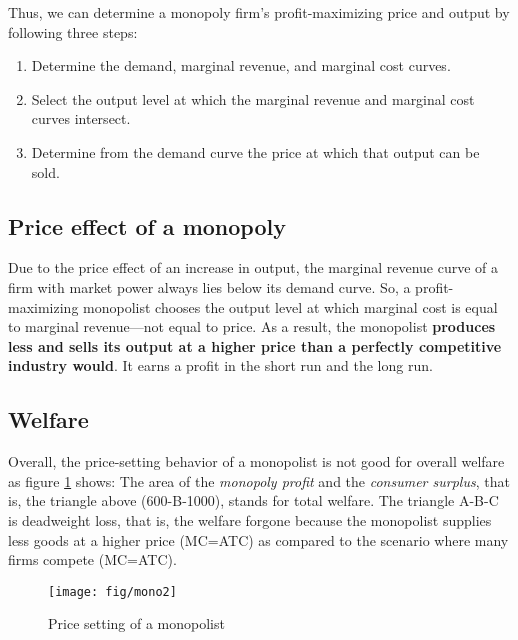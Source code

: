 Thus, we can determine a monopoly firm's profit-maximizing price and output by following three steps:

\begin{enumerate}
	\item
	Determine the demand, marginal revenue, and marginal cost curves.
	\item
	Select the output level at which the marginal revenue and marginal cost curves intersect.
	\item
	Determine from the demand curve the price at which that output can be sold.
\end{enumerate}

\subsection{Price effect of a monopoly}\label{price-effect-of-a-monopoly}

Due to the price effect of an increase in output, the marginal revenue curve of a firm with market power always lies below its demand curve. So, a profit-maximizing monopolist chooses the output level at which marginal cost is equal to marginal revenue---not equal to price. As a result, the monopolist \textbf{produces less and sells its output at a higher price than a perfectly competitive industry would}. It earns a profit in the short run and the long run.

\subsection{Welfare}\label{welfare}

Overall, the price-setting behavior of a monopolist is not good for overall welfare as figure \ref{fig:mono2} shows: The area of the \emph{monopoly profit} and the \emph{consumer surplus}, that is, the triangle above (600-B-1000), stands for total welfare. The triangle A-B-C is deadweight loss, that is, the welfare forgone because the monopolist supplies less goods at a higher price (MC=ATC) as compared to the scenario where many firms compete (MC=ATC).

\begin{figure}
	\centering
	\texttt{[image: fig/mono2]}
	\caption{Price setting of a monopolist}\label{fig:mono2}
\end{figure}


